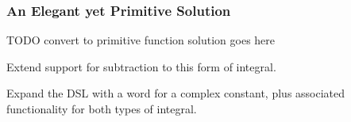 \subsubsection{An Elegant yet Primitive Solution}
TODO convert to primitive function solution goes here

\begin{exercise}
Extend support for subtraction to this form of integral.
\end{exercise}
\begin{exercise}
Expand the DSL with a word for a complex constant, plus associated functionality for both types of integral.
\end{exercise}